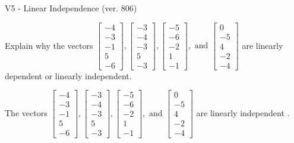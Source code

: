 \begin{exercise}
  \begin{exerciseTitle}V5 - Linear Independence (ver. 806)\end{exerciseTitle}
  \begin{exerciseStatement}
    Explain why the vectors \(\left[\begin{array}{r}
-4 \\
-3 \\
-1 \\
5 \\
-6
\end{array}\right] , \left[\begin{array}{r}
-3 \\
-4 \\
-3 \\
5 \\
-3
\end{array}\right] , \left[\begin{array}{r}
-5 \\
-6 \\
-2 \\
1 \\
-1
\end{array}\right] , \text{ and } \left[\begin{array}{r}
0 \\
-5 \\
4 \\
-2 \\
-4
\end{array}\right]\) are linearly dependent or linearly independent.	


  \end{exerciseStatement}
  \begin{exerciseAnswer}
   The vectors \(\left[\begin{array}{r}
-4 \\
-3 \\
-1 \\
5 \\
-6
\end{array}\right] , \left[\begin{array}{r}
-3 \\
-4 \\
-3 \\
5 \\
-3
\end{array}\right] , \left[\begin{array}{r}
-5 \\
-6 \\
-2 \\
1 \\
-1
\end{array}\right] , \text{ and } \left[\begin{array}{r}
0 \\
-5 \\
4 \\
-2 \\
-4
\end{array}\right]\) are 
  	 linearly independent  .
  


  \end{exerciseAnswer}
\end{exercise}